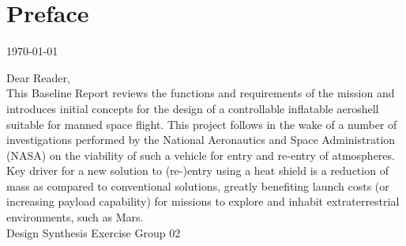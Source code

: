 \section*{Preface}\label{cha:preface}

\begin{flushright}
	\today
\end{flushright}

Dear Reader,	
\\ [1cm]
This Baseline Report reviews the functions and requirements of the mission and introduces initial concepts for the design of a controllable inflatable aeroshell suitable for manned space flight. This project follows in the wake of a number of investigations performed by the National Aeronautics and Space Administration (NASA) on the viability of such a vehicle for entry and re-entry of atmospheres. Key driver for a new solution to (re-)entry using a heat shield is a reduction of mass as compared to conventional solutions, greatly benefiting launch costs (or increasing payload capability) for missions to explore and inhabit extraterrestrial environments, such as Mars. 
\\ [1.5cm]
Design Synthesis Exercise Group 02